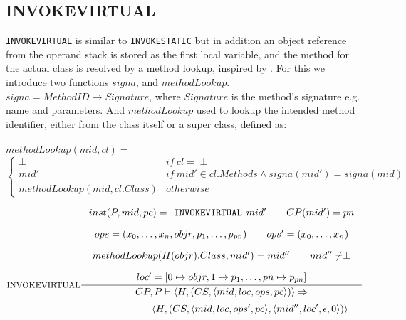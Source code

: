 \subsection{INVOKEVIRTUAL}
\texttt{INVOKEVIRTUAL} is similar to \texttt{INVOKESTATIC} but in addition an object reference from the operand stack is stored as the first local variable, and the method for the actual class is resolved by a method lookup, inspired by \cite{dalvik}. For this we introduce two functions $signa$, and $methodLookup$. $signa = MethodID \to Signature$, where $Signature$ is the method's signature e.g. name and parameters. And $methodLookup$ used to lookup the intended method identifier, either from the class itself or a super class, defined as: \\\\
$methodLookup(mid, cl) = $ \vspace{-10px}
\[
\begin{cases}
  \perp & if\ cl = \perp \\
  mid'  & if\ mid' \in cl.Methods \wedge signa(mid') = signa (mid)  \\
  methodLookup(mid, cl.Class) & otherwise
\end{cases}
\]


$$\inference[INVOKEVIRTUAL]{
inst(P,mid,pc) = \texttt{INVOKEVIRTUAL }mid' \semsp 
CP(mid') = pn \semnl \\
ops = (x_0, \ldots, x_n, objr, p_1, \ldots, p_{pn}) \semsp
ops' = (x_0, \ldots, x_{n}) \semnl\\ 
methodLookup(H(objr).Class, mid') = mid'' \semsp
mid'' \neq \perp \semnl\\
loc' = [0 \mapsto objr, 1 \mapsto p_{1}, \ldots, pn \mapsto p_{pn}]
}
{CP, P \vdash \langle H, (CS, \langle mid, loc, ops, pc \rangle)\rangle \Rightarrow }$$
$$\hspace{130px}\langle H, (CS, \langle mid, loc, ops', pc \rangle, \langle mid'', loc', \epsilon, 0 \rangle)\rangle$$
